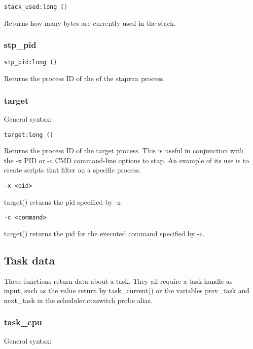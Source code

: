 \documentclass[twoside,english]{article}
\newenvironment{vindent}
{\begin{list}{}{\setlength{\listparindent}{6pt}}
\item[]}
{\end{list}}
\begin{document}
\begin{vindent}
\begin{verbatim}
stack_used:long ()
\end{verbatim}
\end{vindent}
Returns how many bytes are currently used in the stack.


\subsubsection{stp\_pid}
\begin{vindent}
\begin{verbatim}
stp_pid:long ()
\end{verbatim}
\end{vindent}
Returns the process ID of the of the staprun process.


\subsubsection{target}
General syntax:

\begin{vindent}
\begin{verbatim}
target:long ()
\end{verbatim}
\end{vindent}
Returns the process ID of the target process. This is useful
in conjunction with the -x PID or -c CMD command-line options to stap. An
example of its use is to create scripts that filter on a specific process.

\begin{verbatim}
-x <pid>
\end{verbatim}
target() returns the pid specified by -x

\begin{verbatim}
-c <command>
\end{verbatim}
target() returns the pid for the executed command specified
by -c.

\subsection{Task data}

These functions return data about a task.  They all require a task handle as
input, such as the  value return by task\_current() or the variables
prev\_task and next\_task in the scheduler.ctxswitch probe alias.

\subsubsection{task\_cpu}
General syntax:
\end{document}
